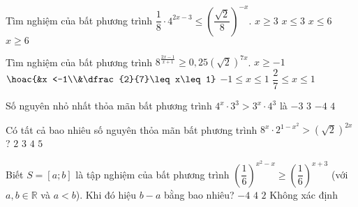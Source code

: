 \begin{ex}%
	Tìm nghiệm của bất phương trình $\dfrac{1}{8}\cdot 4^{2x-3}\leq\left(\dfrac{\sqrt{2}}{8}\right)^{-x}$. 
	\choice
	{$x\geq 3$}
	{$x\leq 3$}
	{\True $x\leq 6$}
	{$x\geq 6$}
\end{ex}
\begin{ex}%
	Tìm nghiệm của bất phương trình $8^{\tfrac{2x-1}{x+1}}\geq 0{,}25(\sqrt{2})^{7x}$. 
	\choice
	{$x\geq-1$}
	{\True $\hoac{&x <-1\\&\dfrac{2}{7}\leq x\leq 1}$}
	{$-1\leq x\leq 1$}
	{$\dfrac{2}{7}\leq x\leq 1$}
\end{ex}
\begin{ex}%
	Số nguyên nhỏ nhất thỏa mãn bất phương trình $4^x\cdot 3^3>3^x\cdot 4^3$ là
	\choice
	{$-3$}
	{$3$}
	{$-4$}
	{\True $4$}
\end{ex}
\begin{ex}%
	Có tất cả bao nhiêu số nguyên thỏa mãn bất phương trình $8^x\cdot 2^{1-x^2}>(\sqrt{2})^{2x}$?
	\choice
	{$2$}
	{\True $3$}
	{$4$}
	{$5$}
\end{ex}
\begin{ex}%
	Biết $S=[a;b]$ là tập nghiệm của bất phương trình $\left(\dfrac{1}{6}\right)^{x^2-x}\geq\left(\dfrac{1}{6}\right)^{x+3}$ (với $a,b\in\mathbb{R}$ và $a<b$). Khi đó hiệu $b-a$ bằng bao nhiêu?
	\choice
	{$-4$}
	{\True $4$}
	{$2$}
	{Không xác định}
\end{ex}
